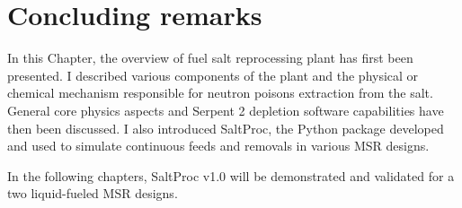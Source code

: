\section{Concluding remarks}
In this Chapter, the overview of fuel salt reprocessing plant has first been 
presented. I described various components of the plant and the physical or 
chemical mechanism responsible for neutron poisons extraction from the salt. 
General core physics aspects and Serpent 2 depletion software capabilities 
have then been discussed. I also introduced SaltProc, the Python package 
developed and used to simulate continuous feeds and removals in various 
\gls{MSR} designs.

In the following chapters, SaltProc v1.0 will be demonstrated and validated 
for a two liquid-fueled \gls{MSR} designs.